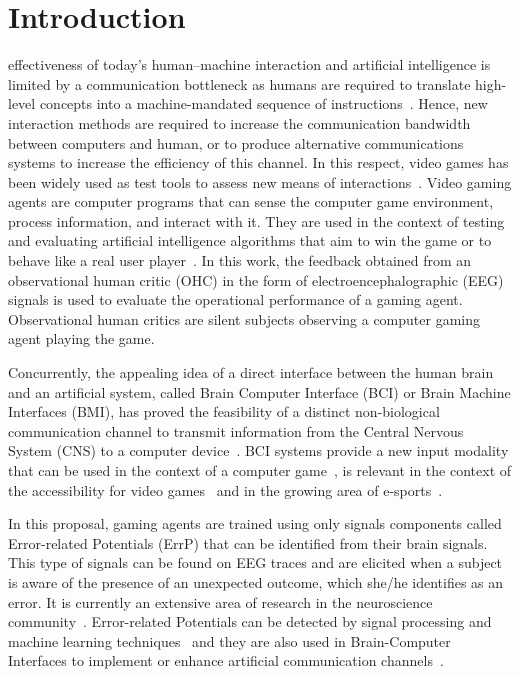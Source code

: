 \documentclass[journal]{IEEEtran}
\begin{document}
\section{Introduction}



 effectiveness of today's human–machine interaction and artificial intelligence is limited by a communication bottleneck as humans are required to translate high-level concepts into a machine-mandated sequence of instructions~\cite{Xu2020,CURSOR-CONTROL-PAPER}.   Hence, new interaction methods are required to increase the communication bandwidth between computers and human, or to produce alternative communications systems to increase the efficiency of this channel.  In this respect, video games has been widely used as test tools to assess new means of interactions~\cite{Carter2014,Barr2007}. Video gaming agents are computer programs that can sense the computer game environment, process information, and interact with it.  They are used in the context of testing and evaluating artificial intelligence algorithms that aim to win the game or to behave like a real user player~\cite{Zhao2020}.
In this work, the feedback obtained from an observational human critic (OHC) in the form of electroencephalographic (EEG) signals is used to evaluate the operational performance of a gaming agent.  Observational human critics are silent subjects observing a computer gaming agent playing the game. 

Concurrently, the appealing idea of a direct interface between the human brain and an artificial system, called Brain Computer Interface (BCI) or Brain Machine Interfaces (BMI), has proved the feasibility of a distinct non-biological communication channel to transmit information from the Central Nervous System (CNS) to a computer device~\cite{Vasiljevic2020}.  BCI systems provide a new input modality that can be used in the context of a computer game~\cite{Scherer2012,Nijholt2007}, is relevant in the context of the accessibility for video games~\cite{Aguado-Delgado2020} and in the growing area of e-sports~\cite{Yakovlev2020}.

In this proposal, gaming agents are trained using only signals components called Error-related Potentials (ErrP) that can be identified from their brain signals.   This type of signals can be found on EEG traces and are elicited when a subject is aware of the presence of an unexpected outcome, which she/he identifies as an error.  It is currently an extensive area of research in the neuroscience community~\cite{Holroyd2009}. Error-related Potentials can be detected by signal processing and machine learning techniques~\cite{EERP-PAPER} and they are also used in Brain-Computer Interfaces to implement or enhance artificial communication channels~\cite{Chavarriaga2014}.
\end{document}
